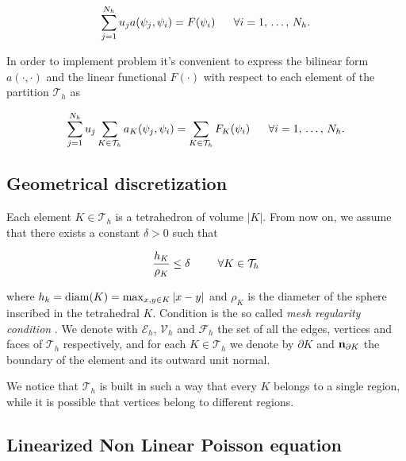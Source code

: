 \begin{equation}
\label{eq: problem galerkin completo}
\sum_{j=1}^{N_h}u_ja(\psi_j,\psi_i) = F(\psi_i) \psp{10} \forall i = 1, \, . \, . \, . \, , \, N_h.
\end{equation}

In order to implement problem  it's convenient to express the bilinear form $a(\cdot,\cdot)$ and the linear functional $F(\cdot)$ with respect to each element of the partition $\mathcal{T}_h$ as

\begin{equation}
\label{eq: sistema algebrico in sommatoria}
\sum_{j=1}^{N_h}u_j\sum_{K\in \mathcal{T}_h}a_K(\psi_j,\psi_i) = \sum_{K\in \mathcal{T}_h}F_K(\psi_i) \psp{10} \forall i = 1, \, . \, . \, . \, , \, N_h.
\end{equation}

\subsection{Geometrical discretization}

Each element $K\in \mathcal{T}_h$ is a tetrahedron of volume $|K|$. From now on, we assume that there exists a constant $\delta>0$ such that

\begin{equation}
\label{eq: mesh regular condition}
\dfrac{h_K}{\rho_K} \leq \delta \psp{15} \forall K \in \mathcal{T}_h
\end{equation}

where $h_k={\rm diam}(K)=\max_{x,y\in K}|x-y|$ and $\rho_K$ is the diameter of the sphere inscribed in the tetrahedral $K$. Condition  is the so called \textit{mesh regularity condition} \cite{quarteroni:modnum} \cite{quarteroni:NumApprox}.
We denote with $\mathcal{E}_h$, $\mathcal{V}_h$ and $\mathcal{F}_h$ the set of all the edges, vertices and faces  
of $\mathcal{T}_h$ respectively, and for each $K\in \mathcal{T}_h$ we denote by $\partial K$ and $\mathbf{n}_{\partial K}$ the boundary of the element and its outward unit normal.
  
We notice that $\mathcal{T}_h$ is built in such a way that every $K$ belongs to a single region, while it is possible that vertices belong to different regions.  
 
 \subsection{Linearized Non Linear Poisson equation}

